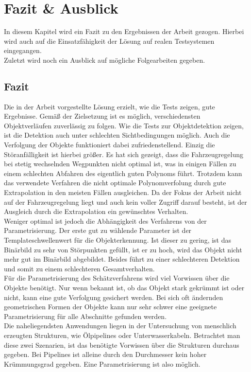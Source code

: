 \section{Fazit \& Ausblick}
In diesem Kapitel wird ein Fazit zu den Ergebnissen der Arbeit gezogen. Hierbei wird auch auf die Einsatzfähigkeit der Lösung auf realen Testsystemen eingegangen.\\
Zuletzt wird noch ein Ausblick auf mögliche Folgearbeiten gegeben.
\subsection{Fazit}
Die in der Arbeit vorgestellte Lösung erzielt, wie die Tests zeigen, gute Ergebnisse. Gemäß der Zielsetzung ist es möglich, verschiedensten Objektverläufen zuverlässig zu folgen. Wie die Tests zur Objektdetektion zeigen, ist die Detektion auch unter schlechten Sichtbedingungen möglich. Auch die Verfolgung der Objekte funktioniert dabei zufriedenstellend. Einzig die Störanfälligkeit ist hierbei größer. Es hat sich gezeigt, dass die Fahrzeugregelung bei stetig wechselnden Wegpunkten nicht optimal ist, was in einigen Fällen zu einem schlechten Abfahren des eigentlich guten Polynoms führt. Trotzdem kann das verwendete Verfahren die nicht optimale Polynomverfolung durch gute Extrapolation in den meisten Fällen ausgleichen. Da der Fokus der Arbeit nicht auf der Fahrzeugregelung liegt und auch kein voller Zugriff darauf besteht, ist der Ausgleich durch die Extrapolation ein gewünschtes Verhalten.\\
Weniger optimal ist jedoch die Abhängigkeit des Verfahrens von der Parametrisierung. Der erste gut zu wählende Parameter ist der Templateschwellenwert für die Objekterkennung. Ist dieser zu gering, ist das Binärbild zu sehr von Störpunkten gefüllt, ist er zu hoch, wird das Objekt nicht mehr gut im Binärbild abgebildet. Beides führt zu einer schlechteren Detektion und somit zu einem schlechteren Gesamtverhalten.\\
Für die Parametrisierung des Schätzverfahrens wird viel Vorwissen über die Objekte benötigt. Nur wenn bekannt ist, ob das Objekt stark gekrümmt ist oder nicht, kann eine gute Verfolgung gesichert werden. Bei sich oft ändernden geometrischen Formen der Objekte kann nur sehr schwer eine geeignete Parametrisierung für alle Abschnitte gefunden werden.\\
Die naheliegendsten Anwendungen liegen in der Untersuchung von menschlich erzeugten Strukturen, wie Ölpipelines oder Unterwasserkabeln. Betrachtet man diese zwei Szenarien, ist das benötigte Vorwissen über die Strukturen durchaus gegeben. Bei Pipelines ist alleine durch den Durchmesser kein hoher Krümmungsgrad gegeben. Eine Parametrisierung ist also möglich.\\

